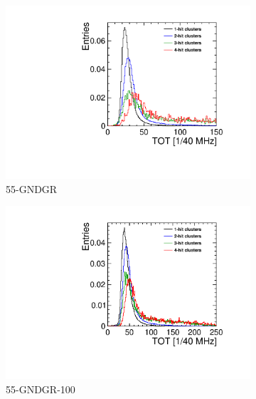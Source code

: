 \begin{figure}[htbp] \centering
  \begin{subfigure}[b]{0.33\textwidth}
    \includegraphics[width=\textwidth]{./figures/Calibration/TOT_Clusters_W0019_G07.pdf}
    \caption{55-GNDGR}
  \end{subfigure} \hfill
  \begin{subfigure}[b]{0.33\textwidth}
    \includegraphics[width=\textwidth]{./figures/Calibration/TOT_Clusters_W0005_E02.pdf}
    \caption{55-GNDGR-100}
  \end{subfigure}\hfill
  \begin{subfigure}[b]{0.33\textwidth}

\end{subfigure}
\end{figure}
